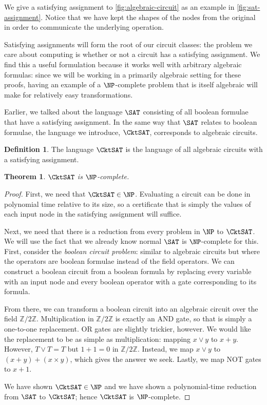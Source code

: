 \documentclass[english,12pt]{reedthesis}
\theoremstyle{plain}
\newtheorem{thm}{Theorem}[section]
\theoremstyle{definition}
\newtheorem{defn}[defn]{Definition}
\theoremstyle{remark}
\begin{document}
We give a satisfying assignment to \cref{fig:algebraic-circuit} as an example in
\cref{fig:sat-assignment}. Notice that we have kept the shapes of the nodes from
the original in order to communicate the underlying operation.

Satisfying assignments will form the root of our circuit classes: the problem we
care about computing is whether or not a circuit has a satisfying assignment.
We find this a useful formulation because it works well with arbitrary algebraic
formulas: since we will be working in a primarily algebraic setting for these
proofs, having an example of a $\NP$-complete problem that is itself algebraic
will make for relatively easy transformations.

Earlier, we talked about the language $\SAT$ consisting of all boolean formulae
that have a satisfying assignment. In the same way that $\SAT$ relates to
boolean formulae, the language we introduce, $\CktSAT$, corresponds to algebraic
circuits.

\begin{defn}\label{def:cktsat}
  The language $\CktSAT$ is the language of all algebraic circuits with a
  satisfying assignment.
\end{defn}

\begin{thm}\label{thm:cktsat-np-complete}
  $\CktSAT$ is $\NP$-complete.
\end{thm}

\begin{proof}
  First, we need that $\CktSAT \in \NP$. Evaluating a circuit can be done in
  polynomial time relative to its size, so a certificate that is simply the
  values of each input node in the satisfying assignment will suffice.

  Next, we need that there is a reduction from every problem in $\NP$ to
  $\CktSAT$. We will use the fact that we already know normal $\SAT$ is
  $\NP$-complete for this. First, consider the \emph{boolean circuit problem}:
  similar to algebraic circuits but where the operators are boolean formulae
  instead of the field operators. We can construct a boolean circuit from a
  boolean formula by replacing every variable with an input node and every
  boolean operator with a gate corresponding to its formula.

  From there, we can transform a boolean circuit into an algebraic circuit over
  the field $\mathbb{Z}/2\mathbb{Z}$. Multiplication in $\mathbb{Z}/2\mathbb{Z}$ is exactly an AND gate, so that is
  simply a one-to-one replacement. OR gates are slightly trickier, however. We
  would like the replacement to be as simple as multiplication: mapping $x \vee y$
  to $x + y$. However, $T \vee T = T$ but $1 + 1 = 0$ in $\mathbb{Z}/2\mathbb{Z}$. Instead, we map
  $x \vee y$ to $(x + y) + (x \times y)$, which gives the answer we seek. Lastly, we map
  NOT gates to $x + 1$.

  We have shown $\CktSAT \in \NP$ and we have shown a polynomial-time reduction
  from $\SAT$ to $\CktSAT$; hence $\CktSAT$ is $\NP$-complete.
\end{proof}
\end{document}

